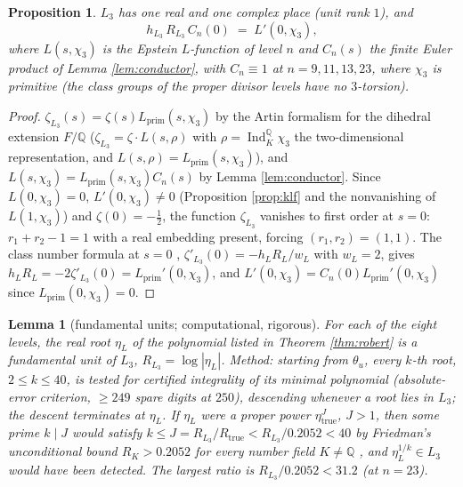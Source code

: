 \documentclass[11pt]{amsart}
\numberwithin{equation}{section}
\theoremstyle{plain}
\newtheorem{proposition}[theorem]{Proposition}
\newtheorem{lemma}[theorem]{Lemma}
\theoremstyle{definition}
\theoremstyle{remark}
\newcommand{\Q}{\mathbb{Q}}
\newcommand{\Lprim}{L_{\mathrm{prim}}}
\begin{document}
\begin{proposition}\label{prop:cubicfield}
$L_3$ has one real and one complex place (unit rank $1$), and
\[
  h_{L_3}\,R_{L_3}\,C_n(0) \;=\; L'(0,\chi_3),
\]
where $L(s,\chi_3)$ is the Epstein $L$-function of level $n$ and
$C_n(s)$ the finite Euler product of Lemma \ref{lem:conductor}, with
$C_n \equiv 1$ at $n = 9, 11, 13, 23$, where $\chi_3$ is primitive
(the class groups of the proper divisor levels have no $3$-torsion).
\end{proposition}

\begin{proof}
$\zeta_{L_3}(s) = \zeta(s)\Lprim(s,\chi_3)$ by the Artin formalism for
the dihedral extension $F/\Q$ ($\zeta_{L_3} = \zeta\cdot L(s,\rho)$ with
$\rho = \operatorname{Ind}_K^\Q\chi_3$ the two-dimensional
representation, and $L(s,\rho) = \Lprim(s,\chi_3)$), and $L(s,\chi_3) =
\Lprim(s,\chi_3)C_n(s)$ by Lemma \ref{lem:conductor}.  Since $L(0,\chi_3)
= 0$, $L'(0,\chi_3) \ne 0$ (Proposition \ref{prop:klf} and the
nonvanishing of $L(1,\chi_3)$) and $\zeta(0) = -\tfrac12$, the function
$\zeta_{L_3}$ vanishes to first order at $s = 0$: $r_1 + r_2 - 1 = 1$
with a real embedding present, forcing $(r_1, r_2) = (1, 1)$.  The class
number formula at $s = 0$ \cite[Cor.~VII.5.11]{Neukirch1999},
$\zeta'_{L_3}(0) = -h_LR_L/w_L$ with $w_L = 2$,
gives $h_LR_L = -2\zeta'_{L_3}(0) = \Lprim'(0,\chi_3)$, and $L'(0,\chi_3)
= C_n(0)\Lprim'(0,\chi_3)$ since $\Lprim(0,\chi_3) = 0$.
\end{proof}

\begin{lemma}[fundamental units; computational, rigorous]
\label{lem:fundunit}
For each of the eight levels, the real root $\eta_L$ of the polynomial
listed in Theorem \ref{thm:robert} is a fundamental unit of $L_3$,
$R_{L_3} = \log|\eta_L|$.  Method: starting from $\theta_u$, every $k$-th
root, $2 \le k \le 40$, is tested for certified integrality of its
minimal polynomial (absolute-error criterion, $\ge 249$ spare digits at
$250$), descending whenever a root lies in $L_3$; the descent terminates
at $\eta_L$.  If $\eta_L$ were a proper power $\eta_{\mathrm{true}}^{J}$,
$J > 1$, then some prime $k \mid J$ would satisfy $k \le J = R_{L_3}/
R_{\mathrm{true}} < R_{L_3}/0.2052 < 40$ by Friedman's unconditional
bound $R_K > 0.2052$ for every number field $K \ne \Q$
\cite{Friedman1989}, and $\eta_L^{1/k} \in L_3$ would have been detected.
The largest ratio is $R_{L_3}/0.2052 < 31.2$ (at $n = 23$).
\end{lemma}
\end{document}
